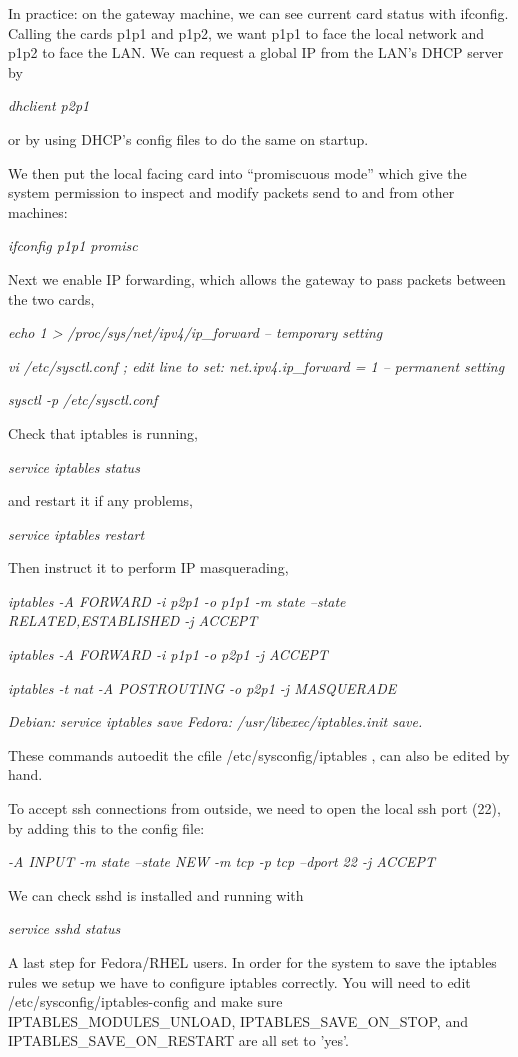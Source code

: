 \documentclass[oneside,english]{scrbook}
\begin{document}
In practice: on the gateway machine, we can see current card status
with ifconfig. Calling the cards p1p1 and p1p2, we want p1p1 to face
the local network and p1p2 to face the LAN. We can request a global
IP from the LAN's DHCP server by 

\emph{dhclient p2p1}

or by using DHCP's config files to do the same on startup.

We then put the local facing card into ``promiscuous mode'' which
give the system permission to inspect and modify packets send to and
from other machines:

\emph{ifconfig p1p1 promisc}

Next we enable IP forwarding, which allows the gateway to pass packets
between the two cards,

\emph{echo 1 > /proc/sys/net/ipv4/ip\_forward -- temporary setting}

\emph{vi /etc/sysctl.conf ; edit line to set: net.ipv4.ip\_forward
= 1 -- permanent setting}

\emph{sysctl -p /etc/sysctl.conf}

Check that iptables is running,

\emph{service iptables status}

and restart it if any problems,

\emph{service iptables restart}

Then instruct it to perform IP masquerading,

\emph{iptables -A FORWARD -i p2p1 -o p1p1 -m state --state RELATED,ESTABLISHED
-j ACCEPT }

\emph{iptables -A FORWARD -i p1p1 -o p2p1 -j ACCEPT }

\emph{iptables -t nat -A POSTROUTING -o p2p1 -j MASQUERADE}

\emph{Debian: service iptables save Fedora: /usr/libexec/iptables.init
save.}

These commands autoedit the cfile /etc/sysconfig/iptables , can also
be edited by hand.

To accept ssh connections from outside, we need to open the local
ssh port (22), by adding this to the config file:

\emph{-A INPUT -m state --state NEW -m tcp -p tcp --dport 22 -j ACCEPT}

We can check sshd is installed and running with

\emph{service sshd status }

A last step for Fedora/RHEL users. In order for the system to save
the iptables rules we setup we have to configure iptables correctly.
You will need to edit /etc/sysconfig/iptables-config and make sure
IPTABLES\_MODULES\_UNLOAD, IPTABLES\_SAVE\_ON\_STOP, and IPTABLES\_SAVE\_ON\_RESTART
are all set to 'yes'.
\end{document}
